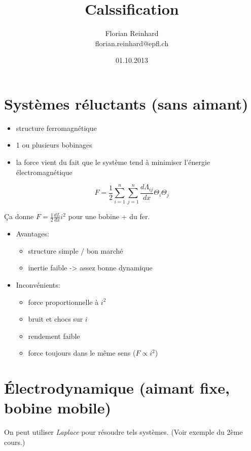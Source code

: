 \documentclass[a4paper,12pt,notitlepage]{article}
\title{Calssification}
\date{01.10.2013}
\author{
    Florian Reinhard\\
    florian.reinhard@epfl.ch
}
\begin{document}
    \maketitle

    \section{Systèmes réluctants (sans aimant)}
    \begin{itemize}
        \item structure ferromagnétique
        \item 1 ou plusieurs bobinages
        \item la force vient du fait que le système tend à minimiser l'énergie
            électromagnétique
    \end{itemize}

    \begin{equation}
        F = \frac{1}{2}\sum^n_{i=1}\sum^n_{j=1}\frac{d\Lambda_{ij}}{dx}\Theta_i\Theta_j
        \label{force}
    \end{equation}
    
    Ça donne $ F = \frac{1}{2}\frac{dL}{dx}i^2 $ pour une bobine + du fer.

    \begin{itemize}
        \item Avantages:
            \begin{itemize}
                \item structure simple / bon marché
                \item inertie faible -> assez bonne dynamique
            \end{itemize}
        \item Inconvénients:
            \begin{itemize}
                \item force proportionnelle à $ i^2 $
                \item bruit et chocs sur $ i $
                \item rendement faible
                \item force toujours dans le même sens ($ F \propto i^2 $)
            \end{itemize}
    \end{itemize}

    \section{Électrodynamique (aimant fixe, bobine mobile)}
    On peut utiliser \emph{Laplace} pour résoudre tels systèmes.
    (Voir exemple du 2ème cours.)
\end{document}

